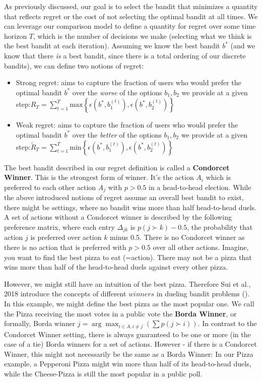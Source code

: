 \documentclass[
  letterpaper,
  numbers=noenddot,
  DIV=11]{scrreprt}
\theoremstyle{plain}
\theoremstyle{definition}
\theoremstyle{remark}
\begin{document}
As previously discussed, our goal is to select the bandit that minimizes
a quantity that reflects regret or the cost of not selecting the optimal
bandit at all times. We can leverage our comparison model to define a
quantity for regret over some time horizon \(T\), which is the number of
decisions we make (selecting what we think is the best bandit at each
iteration). Assuming we know the best bandit \(b^*\) (and we know that
there \emph{is} a best bandit, since there is a total ordering of our
discrete bandits), we can define two notions of regret:

\begin{itemize}
\item
  Strong regret: aims to capture the fraction of users who would prefer
  the optimal bandit \(b^*\) over the \emph{worse} of the options
  \(b_1, b_2\) we provide at a given
  step:\(R_T = \sum_{t = 1}^T \text{max} \left\{ \epsilon(b^*, b_1^{(t)}), \epsilon(b^*, b_2^{(t)}) \right\}\)
\item
  Weak regret: aims to capture the fraction of users who would prefer
  the optimal bandit \(b^*\) over the \emph{better} of the options
  \(b_1, b_2\) we provide at a given
  step:\(\tilde{R}_T = \sum_{t = 1}^T \text{min} \left\{ \epsilon(b^*, b_1^{(t)}), \epsilon(b^*, b_2^{(t)}) \right\}\)
\end{itemize}

The best bandit described in our regret definition is called a
\textbf{Condorcet Winner}. This is the strongest form of winner. It's
the action \textbf{\(A_{i}\)} which is preferred to each other action
\textbf{\(A_j\)} with \(p > 0.5\) in a head-to-head election. While the
above introduced notions of regret assume an overall best bandit to
exist, there might be settings, where no bandit wins more than half
head-to-head duels. A set of actions without a Condorcet winner is
described by the following preference matrix, where each entry
\(\Delta_{jk}\) is \(p(j \succ k) - 0.5\), the probability that action
\(j\) is preferred over action \(k\) minus 0.5. There is no Condorcet
winner as there is no action that is preferred with \(p > 0.5\) over all
other actions. Imagine, you want to find the best pizza to eat
(=action). There may not be a pizza that wins more than half of the
head-to-head duels against every other pizza.

However, we might still have an intuition of the best pizza. Therefore
Sui et al., 2018 introduce the concepts of different
\(\textit{winners}\) in dueling bandit problems
(). In this example,
we might define the best pizza as the most popular one. We call the
Pizza receiving the most votes in a public vote the \textbf{Borda
Winner}, or formally, Borda winner
\(j = \arg\max_{i \in A, i \neq j} \left(\sum p(j \succ i)\right)\). In
contrast to the Condorcet Winner setting, there is always guaranteed to
be one or more (in the case of a tie) Borda winners for a set of
actions. However - if there is a Condorcet Winner, this might not
necessarily be the same as a Borda Winner: In our Pizza example, a
Pepperoni Pizza might win more than half of its head-to-head duels,
while the Cheese-Pizza is still the most popular in a public poll.
\end{document}
